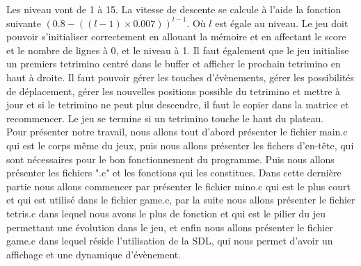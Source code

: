\documentclass[a4paper,10p]{report}
\begin{document}
Les niveau vont de 1 à 15. La vitesse de descente se calcule à l'aide la fonction suivante $(0.8-((l-1)\times0.007))^{l-1}$. Où $l$ est égale au niveau. Le jeu doit pouvoir s'initialiser correctement en allouant la mémoire et en affectant le score et le nombre de lignes à 0, et le niveau à 1. Il faut également que le jeu initialise un premiers tetrimino centré dans le buffer et afficher le prochain tetrimino en haut à droite. Il faut pouvoir gérer les touches d'évènements, gérer les possibilités de déplacement, gérer les nouvelles positions possible du tetrimino et mettre à jour et si le tetrimino ne peut plus descendre, il faut le copier dans la matrice et recommencer. Le jeu se termine si un tetrimino touche le haut du plateau.
\\
Pour présenter notre travail, nous allons tout d'abord présenter le fichier main.c qui est le corps même du jeux, puis nous allons présenter les fichers d'en-tête, qui sont nécessaires pour le bon fonctionnement du programme. Puis nous allons présenter les fichiers ".c" et les fonctions qui les constitues. Dans cette dernière partie nous allons commencer par présenter le fichier mino.c qui est le plus court et qui est utilisé dans le fichier game.c, par la suite nous allons présenter le fichier tetris.c dans lequel nous avons le plus de fonction et qui est le pilier du jeu permettant une évolution dans le jeu, et enfin nous allons présenter le fichier game.c dans lequel réside l'utilisation de la SDL, qui nous permet d'avoir un affichage et une dynamique d'évènement.
\end{document}
